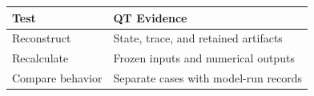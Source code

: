 \begin{tabular}{@{}P{4.0cm}P{8.5cm}@{}}
\toprule
\textbf{Test} & \textbf{QT Evidence} \\
\midrule
Reconstruct & State, trace, and retained artifacts \\
Recalculate & Frozen inputs and numerical outputs \\
Compare behavior & Separate cases with model-run records \\
\bottomrule
\end{tabular}
